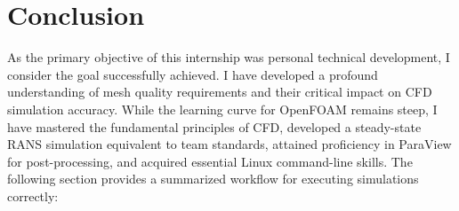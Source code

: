 \documentclass[a4paper]{article}
\begin{document}
	\section{Conclusion}
	As the primary objective of this internship was personal technical development, I consider the goal successfully achieved.
	I have developed a profound understanding of mesh quality requirements and their critical impact on CFD simulation accuracy.
	While the learning curve for OpenFOAM remains steep, I have mastered the fundamental principles of CFD, developed a steady-state RANS simulation equivalent to team standards, attained proficiency in ParaView for post-processing, and acquired essential Linux command-line skills.
	The following section provides a summarized workflow for executing simulations correctly:
	
	 
	  
	
	
	\appendix
	\newpage
\end{document}
